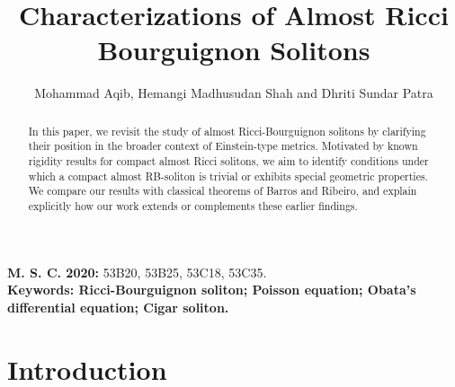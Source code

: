 \documentclass[a4paper, twoside, 10pt]{article}
\title{\textbf{Characterizations of Almost Ricci Bourguignon Solitons}}
\author{Mohammad Aqib, Hemangi Madhusudan Shah
and Dhriti Sundar Patra}
\date{}
\numberwithin{equation}{section}
\theoremstyle{definition}
\begin{document}
	\maketitle	
	\begin{abstract}
In this paper, we revisit the study of almost Ricci-Bourguignon solitons by clarifying their position in the broader context of Einstein-type metrics. Motivated by known rigidity results for compact almost Ricci solitons, we aim to identify conditions under which a compact almost RB-soliton is trivial or exhibits special geometric properties. We compare our results with classical theorems of Barros and Ribeiro, and explain explicitly how our work extends or complements these earlier findings.
\end{abstract}



	
	
	
	\textbf {M. S. C. 2020:} 53B20, 53B25, 53C18, 53C35.\\
	
	\noindent
	\textbf{Keywords:  Ricci-Bourguignon soliton; Poisson equation;  Obata's differential equation; Cigar soliton.}

	
	\tableofcontents 



    
\section{Introduction}\label{sec1}


\end{document}
